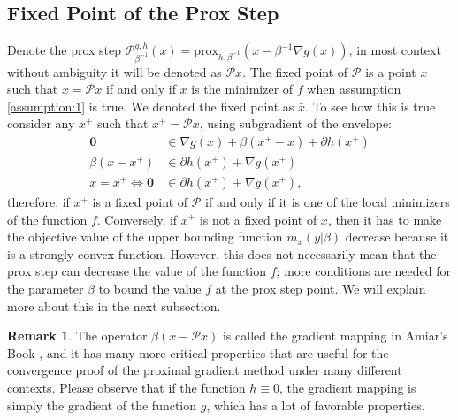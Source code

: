 \documentclass[]{article}
\theoremstyle{definition}
\newtheorem{remark}{Remark}[subsection]
{
    \newtheorem{assumption}{Assumption}
}
\begin{document}
    \subsection{Fixed Point of the Prox Step}\label{sec:fixed_point_prox}
        Denote the prox step $\mathcal P_{\beta^{-1}}^{g, h}(x) = \text{prox}_{h, \beta^{-1}}(x - \beta^{-1}\nabla g(x))$, in most context without ambiguity it will be denoted as $\mathcal Px$. The fixed point of $\mathcal P$ is a point $x$ such that $x = \mathcal P x$ if and only if $x$ is the minimizer of $f$ when \hyperref[assumption:1]{assumption \ref*{assumption:1}} is true. We denoted the fixed point as $\bar x$. To see how this is true consider any $x^+$ such that $x^+ = \mathcal Px$, using subgradient of the envelope: 
        \begin{align*}
            \mathbf 0 
            &\in \nabla g(x) + \beta(x^+ - x) + \partial h(x^+)
            \\
            \beta(x - x^+) &\in \partial h(x^+) + \nabla g(x^+)
            \\
            x = x^+ \iff \mathbf 0 &\in 
            \partial h(x^+) + \nabla g(x^+), 
        \end{align*}
        therefore, if $x^+$ is a fixed point of $\mathcal P$ if and only if it is one of the local minimizers of the function $f$. Conversely, if $x^+$ is not a fixed point of $x$, then it has to make the objective value of the upper bounding function $m_x(y| \beta)$ decrease because it is a strongly convex function. However, this does not necessarily mean that the prox step can decrease the value of the function $f$; more conditions are needed for the parameter $\beta$ to bound the value $f$ at the prox step point. We will explain more about this in the next subsection. 
        \begin{remark}
            The operator $\beta(x - \mathcal Px)$ is called the gradient mapping in Amiar's Book \cite{book:first_order_opt}, and it has many more critical properties that are useful for the convergence proof of the proximal gradient method under many different contexts. Please observe that if the function $h \equiv 0$, the gradient mapping is simply the gradient of the function $g$, which has a lot of favorable properties.
        \end{remark}
\end{document}
